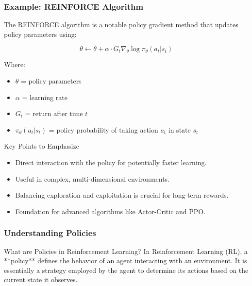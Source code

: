 \documentclass{beamer}
\begin{document}
\begin{frame}[fragile]
    \frametitle{Example: REINFORCE Algorithm}

    The REINFORCE algorithm is a notable policy gradient method that updates policy parameters using:

    \begin{equation}
    \theta \leftarrow \theta + \alpha \cdot G_t \nabla_\theta \log \pi_\theta(a_t | s_t)
    \end{equation}

    Where:
    \begin{itemize}
        \item \( \theta \) = policy parameters
        \item \( \alpha \) = learning rate
        \item \( G_t \) = return after time \( t \)
        \item \( \pi_\theta(a_t | s_t) \) = policy probability of taking action \( a_t \) in state \( s_t \)
    \end{itemize}
    
    \begin{block}{Key Points to Emphasize}
        \begin{itemize}
            \item Direct interaction with the policy for potentially faster learning.
            \item Useful in complex, multi-dimensional environments.
            \item Balancing exploration and exploitation is crucial for long-term rewards.
            \item Foundation for advanced algorithms like Actor-Critic and PPO.
        \end{itemize}
    \end{block}
\end{frame}

\begin{frame}[fragile]
    \frametitle{Understanding Policies}
    \begin{block}{What are Policies in Reinforcement Learning?}
        In Reinforcement Learning (RL), a **policy** defines the behavior of an agent interacting with an environment. It is essentially a strategy employed by the agent to determine its actions based on the current state it observes.
    \end{block}
\end{frame}
\end{document}
